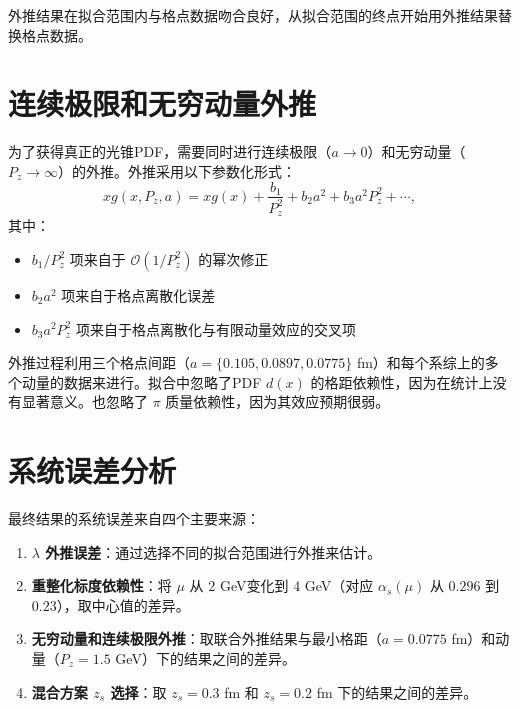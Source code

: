 \documentclass[11pt,a4paper]{article}
\newcommand{\Pz}{P_z}
\newcommand{\alphas}{\alpha_s}
\begin{document}
外推结果在拟合范围内与格点数据吻合良好，从拟合范围的终点开始用外推结果替换格点数据。

\section{连续极限和无穷动量外推}

为了获得真正的光锥PDF，需要同时进行连续极限（$a \to 0$）和无穷动量（$\Pz \to \infty$）的外推。外推采用以下参数化形式：
\begin{equation}\label{eq:cont_extrap}
    x g(x, \Pz, a) = x g(x) + \frac{b_1}{\Pz^2} + b_2 a^2 + b_3 a^2 \Pz^2 + \cdots,
\end{equation}
其中：
\begin{itemize}
    \item $b_1/\Pz^2$ 项来自于 $\mathcal{O}(1/\Pz^2)$ 的幂次修正
    \item $b_2 a^2$ 项来自于格点离散化误差
    \item $b_3 a^2 \Pz^2$ 项来自于格点离散化与有限动量效应的交叉项
\end{itemize}

外推过程利用三个格点间距（$a = \{0.105, 0.0897, 0.0775\}$ fm）和每个系综上的多个动量的数据来进行。拟合中忽略了PDF $d(x)$ 的格距依赖性，因为在统计上没有显著意义。也忽略了 $\pi$ 质量依赖性，因为其效应预期很弱。

\section{系统误差分析}

最终结果的系统误差来自四个主要来源：

\begin{enumerate}[label=(\arabic*), leftmargin=*]
    \item \textbf{$\lambda$ 外推误差}：通过选择不同的拟合范围进行外推来估计。
    \item \textbf{重整化标度依赖性}：将 $\mu$ 从 $2$ GeV变化到 $4$ GeV（对应 $\alphas(\mu)$ 从 $0.296$ 到 $0.23$），取中心值的差异。
    \item \textbf{无穷动量和连续极限外推}：取联合外推结果与最小格距（$a = 0.0775$ fm）和动量（$\Pz = 1.5$ GeV）下的结果之间的差异。
    \item \textbf{混合方案 $z_s$ 选择}：取 $z_s = 0.3$ fm 和 $z_s = 0.2$ fm 下的结果之间的差异。
\end{enumerate}
\end{document}
